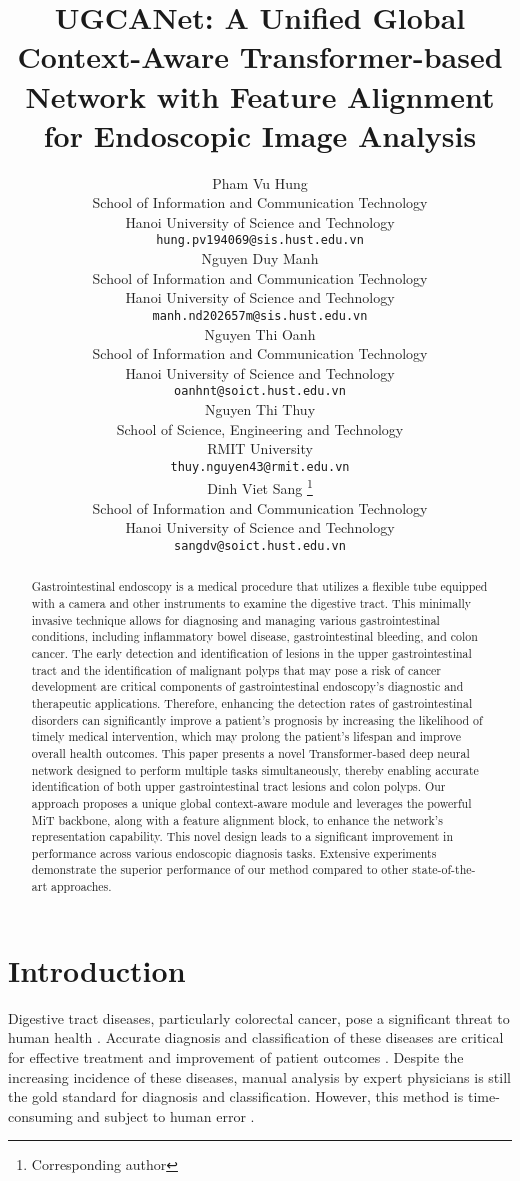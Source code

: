 \documentclass{article}
\title{UGCANet: A Unified Global Context-Aware Transformer-based Network with Feature Alignment for Endoscopic Image Analysis}
\author{{Pham Vu Hung} \\
School of Information and Communication Technology\\
Hanoi University of Science and Technology\\
\texttt{hung.pv194069@sis.hust.edu.vn} \\
\And
{Nguyen Duy Manh} \\
School of Information and Communication Technology\\
Hanoi University of Science and Technology\\
\texttt{manh.nd202657m@sis.hust.edu.vn} \\
\And
{Nguyen Thi Oanh} \\
School of Information and Communication Technology\\
Hanoi University of Science and Technology\\
\texttt{oanhnt@soict.hust.edu.vn} \\
\And
{Nguyen Thi Thuy} \\
School of Science, Engineering and Technology\\
RMIT University\\
\texttt{thuy.nguyen43@rmit.edu.vn} \\
\And
{Dinh Viet Sang} \thanks{Corresponding author}\\
School of Information and Communication Technology\\
Hanoi University of Science and Technology\\
\texttt{sangdv@soict.hust.edu.vn} \\
}
\begin{document}
\maketitle

\begin{abstract}
Gastrointestinal endoscopy is a medical procedure that utilizes a flexible tube equipped with a camera and other instruments to examine the digestive tract. This minimally invasive technique allows for diagnosing and managing various gastrointestinal conditions, including inflammatory bowel disease, gastrointestinal bleeding, and colon cancer.
The early detection and identification of lesions in the upper gastrointestinal tract and the identification of malignant polyps that may pose a risk of cancer development are critical components of gastrointestinal endoscopy's diagnostic and therapeutic applications. Therefore, enhancing the detection rates of gastrointestinal disorders can significantly improve a patient's prognosis by increasing the likelihood of timely medical intervention, which may prolong the patient's lifespan and improve overall health outcomes.
This paper presents a novel Transformer-based deep neural network designed to perform multiple tasks simultaneously, thereby enabling accurate identification of both upper gastrointestinal tract lesions and colon polyps.
Our approach proposes a unique global context-aware module and leverages the powerful MiT backbone, along with a feature alignment block, to enhance the network's representation capability. This novel design leads to a significant improvement in performance across various endoscopic diagnosis tasks. Extensive experiments demonstrate the superior performance of our method compared to other state-of-the-art approaches.

\end{abstract}















\section{Introduction}
Digestive tract diseases, particularly colorectal cancer, pose a significant threat to human health \cite{siegel2018cancer}. Accurate diagnosis and classification of these diseases are critical for effective treatment and improvement of patient outcomes \cite{liu2017automatic}. Despite the increasing incidence of these diseases, manual analysis by expert physicians is still the gold standard for diagnosis and classification. However, this method is time-consuming and subject to human error \cite{qin2017computer}.
\end{document}

